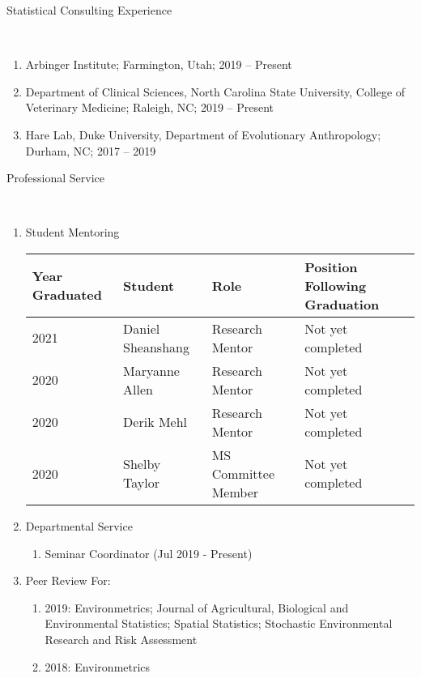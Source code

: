 \documentclass[12pt]{article}
\newcommand{\head}[1]{ %
    \bigskip %
    \begin{large}\begin{bf}{#1}\end{bf}\end{large} %

    \ \\ [-1.3cm] %

    \hrulefill}
\begin{document}
\head{Statistical Consulting Experience}

\begin{enumerate}[label=$\bullet$]

\item Arbinger Institute; Farmington, Utah; 2019 -- Present

\item Department of Clinical Sciences, North Carolina State University, College of Veterinary Medicine; Raleigh, NC; 2019 -- Present

\item Hare Lab, Duke University, Department of Evolutionary Anthropology; Durham, NC; 2017 -- 2019

\end{enumerate}



\head{Professional Service}
\begin{enumerate}[label=$\bullet$]

\item Student Mentoring

\begin{table}[H]
\centering
\begin{tabular}{llll}
  \hline
Year Graduated & Student & Role & Position Following Graduation \\ 
  \hline
  2021  & Daniel Sheanshang & Research Mentor & Not yet completed \\ 
2020  & Maryanne Allen & Research Mentor & Not yet completed \\ 
2020  & Derik Mehl & Research Mentor & Not yet completed  \\ 
2020  & Shelby Taylor & MS Committee Member & Not yet completed  \\ 
   \hline
\end{tabular}
\end{table}

\item Departmental Service
\begin{enumerate}[label=$\cdot$]
\item Seminar Coordinator (Jul 2019 - Present)
\end{enumerate}

\item Peer Review For:
\begin{enumerate}[label=$\cdot$]
\item 2019: Environmetrics; Journal of Agricultural, Biological and Environmental Statistics; Spatial Statistics; Stochastic Environmental Research and Risk Assessment 
\item 2018: Environmetrics 
\end{enumerate}
\end{enumerate}
\end{document}

